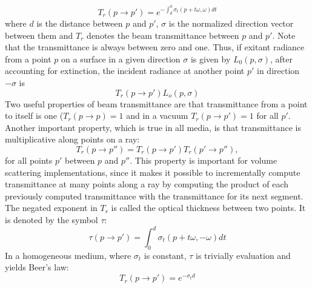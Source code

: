 \documentclass{article}
\begin{document}
\newline \newline
\begin{equation}
T_{r}(p\rightarrow p') = e^{-\int_d^0 \sigma_{t}(p+t\omega,\omega)dt}
\end{equation}
\newline
where $d$ is the distance between $p$ and $p'$, $\sigma$ is the normalized direction vector between them and $T_{r}$ denotes the beam transmittance between $p$ and $p'$. Note that the transmittance is always between zero and one. Thus, if exitant radiance from a point $p$ on a surface in a given direction $\sigma$ is given by $L_{0}(p,\sigma)$, after accounting for extinction, the incident radiance at another point $p'$ in direction $-\sigma$ is
\newline \newline
\begin{equation}
T_{r}(p\rightarrow p')L_{o}(p,\sigma)
\end{equation}
\newline
Two useful properties of beam transmittance are that transmittance from a point to itself is one ($T_{r}(p\rightarrow p) = 1$ and in a vacuum $T_{r}(p\rightarrow p') = 1$ for all $p'$. Another important property, which is true in all media, is that transmittance is multiplicative along points on a ray:
\newline \newline
\begin{equation}
T_{r}(p\rightarrow p'') = T_{r}(p\rightarrow p')T_{r}(p'\rightarrow p''),
\end{equation}
\newline
for all points $p'$ between $p$ and $p''$. This property is important for volume scattering implementations, since it makes it possible to incrementally compute transmittance at many points along a ray by computing the product of each previously computed transmittance with the transmittance for its next segment.
\newline \newline
The negated exponent in $T_{r}$ is called the optical thickness between two points. It is denoted by the symbol $\tau$:
\newline \newline
\begin{equation}
\tau(p\rightarrow p') = \int_0^d\sigma_{t}(p+t\omega, -\omega)dt
\end{equation}
\newline
In a homogeneous medium, where $\sigma_{t}$ is constant, $\tau$ is trivially evaluation and yields Beer's law:
\newline \newline
\begin{equation}
T_{r}(p \rightarrow p') = e^{-\sigma_{t}d}
\end{equation}
\end{document}
